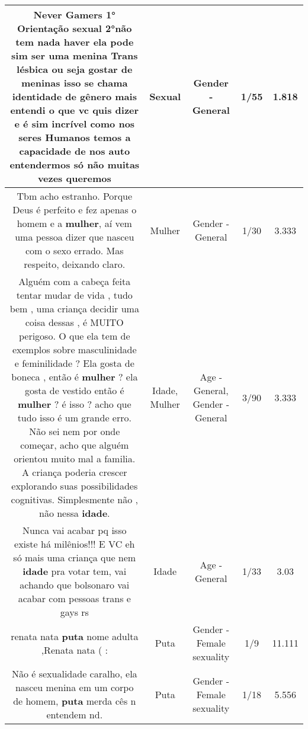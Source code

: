 \documentclass[11pt]{article}
\newlength\mylength
\begin{document}
\begin{center}
\begin{longtable}{|C{.65\mylength}|C{.30\mylength}|C{.12\mylength}|C{.12\mylength}|C{.12\mylength}|}
  \small Never Gamers 1° Orientação \textbf{sexual} 2°não  tem nada haver ela pode sim ser uma menina Trans lésbica  ou seja gostar de meninas isso se chama identidade de gênero  mais entendi o que vc quis  dizer e é sim incrível  como nos seres Humanos temos a capacidade  de nos auto entendermos só  não muitas vezes queremos\normalsize   & Sexual & Gender - General & 1/55 & 1.818 \\  \hline
  \small Tbm acho estranho. Porque Deus é perfeito e fez apenas o homem e a \textbf{mulher}, aí vem uma pessoa dizer que nasceu com o sexo errado. Mas respeito, deixando claro.\normalsize   & Mulher & Gender - General & 1/30 & 3.333 \\  \hline
  \small Alguém com a cabeça feita tentar mudar de vida , tudo bem , uma criança decidir uma coisa dessas , é MUITO perigoso. O que ela tem de exemplos  sobre masculinidade e feminilidade ? Ela gosta de boneca , então é \textbf{mulher} ? ela gosta de vestido então é \textbf{mulher} ?  é isso ? acho que tudo isso é um grande erro. Não sei nem por onde começar, acho que alguém orientou muito mal a familia. A criança poderia crescer explorando suas possibilidades cognitivas. Simplesmente não , não nessa \textbf{idade}.\normalsize   & Idade, Mulher & Age - General, Gender - General & 3/90 & 3.333 \\  \hline
  \small Nunca vai acabar pq isso existe há milênios!!! E VC eh só mais uma criança que nem \textbf{idade} pra votar tem, vai achando que bolsonaro vai acabar com pessoas trans e gays rs\normalsize   & Idade & Age - General & 1/33 & 3.03 \\  \hline
  \small renata nata  \textbf{puta} nome adulta ,Renata nata  ( :\normalsize   & Puta & Gender - Female sexuality & 1/9 & 11.111 \\  \hline
  \small Não é sexualidade caralho, ela nasceu menina em um corpo de homem, \textbf{puta} merda cês n entendem nd.\normalsize   & Puta & Gender - Female sexuality & 1/18 & 5.556 \\  \hline

\end{longtable}
\end{center}
\end{document}
